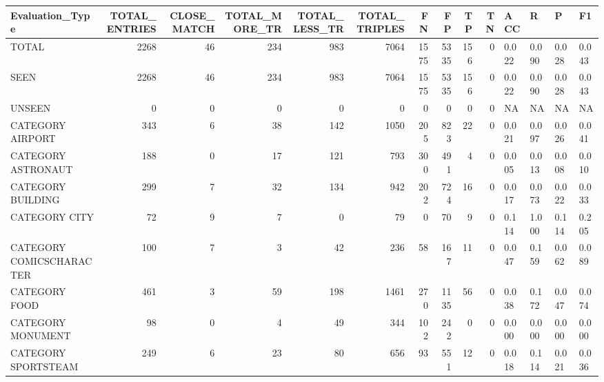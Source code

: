 \begin{tabular}{lrrrrrrrrrllll}
\hline
 Evaluation\_Type          &   TOTAL\_ENTRIES &   CLOSE\_MATCH &   TOTAL\_MORE\_TR &   TOTAL\_LESS\_TR &   TOTAL\_TRIPLES &   FN &   FP &   TP &   TN & ACC   & R     & P     & F1    \\
\hline
 TOTAL                    &            2268 &            46 &             234 &             983 &            7064 & 1575 & 5335 &  156 &    0 & 0.022 & 0.090 & 0.028 & 0.043 \\
 SEEN                     &            2268 &            46 &             234 &             983 &            7064 & 1575 & 5335 &  156 &    0 & 0.022 & 0.090 & 0.028 & 0.043 \\
 UNSEEN                   &               0 &             0 &               0 &               0 &               0 &    0 &    0 &    0 &    0 & NA    & NA    & NA    & NA    \\
 CATEGORY AIRPORT         &             343 &             6 &              38 &             142 &            1050 &  205 &  823 &   22 &    0 & 0.021 & 0.097 & 0.026 & 0.041 \\
 CATEGORY ASTRONAUT       &             188 &             0 &              17 &             121 &             793 &  300 &  491 &    4 &    0 & 0.005 & 0.013 & 0.008 & 0.010 \\
 CATEGORY BUILDING        &             299 &             7 &              32 &             134 &             942 &  202 &  724 &   16 &    0 & 0.017 & 0.073 & 0.022 & 0.033 \\
 CATEGORY CITY            &              72 &             9 &               7 &               0 &              79 &    0 &   70 &    9 &    0 & 0.114 & 1.000 & 0.114 & 0.205 \\
 CATEGORY COMICSCHARACTER &             100 &             7 &               3 &              42 &             236 &   58 &  167 &   11 &    0 & 0.047 & 0.159 & 0.062 & 0.089 \\
 CATEGORY FOOD            &             461 &             3 &              59 &             198 &            1461 &  270 & 1135 &   56 &    0 & 0.038 & 0.172 & 0.047 & 0.074 \\
 CATEGORY MONUMENT        &              98 &             0 &               4 &              49 &             344 &  102 &  242 &    0 &    0 & 0.000 & 0.000 & 0.000 & 0.000 \\
 CATEGORY SPORTSTEAM      &             249 &             6 &              23 &              80 &             656 &   93 &  551 &   12 &    0 & 0.018 & 0.114 & 0.021 & 0.036 \\

\end{tabular}

